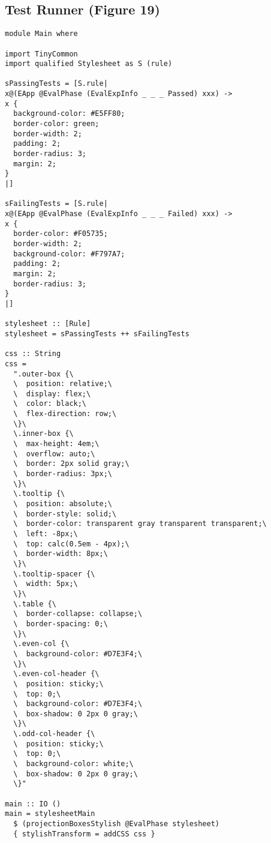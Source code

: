 \documentclass[acmsmall, screen]{acmart}
\begin{document}
\subsection{Test Runner (Figure 19)}
\label{sec:listing-test-runner}
{\scriptsize
\begin{verbatim}
module Main where

import TinyCommon
import qualified Stylesheet as S (rule)

sPassingTests = [S.rule|
x@(EApp @EvalPhase (EvalExpInfo _ _ _ Passed) xxx) ->
x {
  background-color: #E5FF80;
  border-color: green;
  border-width: 2;
  padding: 2;
  border-radius: 3;
  margin: 2;
}
|]

sFailingTests = [S.rule|
x@(EApp @EvalPhase (EvalExpInfo _ _ _ Failed) xxx) ->
x {
  border-color: #F05735;
  border-width: 2;
  background-color: #F797A7;
  padding: 2;
  margin: 2;
  border-radius: 3;
}
|]

stylesheet :: [Rule]
stylesheet = sPassingTests ++ sFailingTests

css :: String
css =
  ".outer-box {\
  \  position: relative;\
  \  display: flex;\
  \  color: black;\
  \  flex-direction: row;\
  \}\
  \.inner-box {\
  \  max-height: 4em;\
  \  overflow: auto;\
  \  border: 2px solid gray;\
  \  border-radius: 3px;\
  \}\
  \.tooltip {\
  \  position: absolute;\
  \  border-style: solid;\
  \  border-color: transparent gray transparent transparent;\
  \  left: -8px;\
  \  top: calc(0.5em - 4px);\
  \  border-width: 8px;\
  \}\
  \.tooltip-spacer {\
  \  width: 5px;\
  \}\
  \.table {\
  \  border-collapse: collapse;\
  \  border-spacing: 0;\
  \}\
  \.even-col {\
  \  background-color: #D7E3F4;\
  \}\
  \.even-col-header {\
  \  position: sticky;\
  \  top: 0;\
  \  background-color: #D7E3F4;\
  \  box-shadow: 0 2px 0 gray;\
  \}\
  \.odd-col-header {\
  \  position: sticky;\
  \  top: 0;\
  \  background-color: white;\
  \  box-shadow: 0 2px 0 gray;\
  \}"

main :: IO ()
main = stylesheetMain
  $ (projectionBoxesStylish @EvalPhase stylesheet)
  { stylishTransform = addCSS css }

\end{verbatim}}
\clearpage
\end{document}
